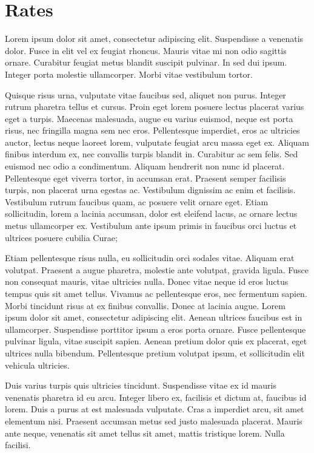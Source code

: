 \chapter{Rates}
\label{ch:10}

Lorem ipsum dolor sit amet, consectetur adipiscing elit. Suspendisse a venenatis dolor. Fusce in elit vel ex feugiat rhoncus. Mauris vitae mi non odio sagittis ornare. Curabitur feugiat metus blandit suscipit pulvinar. In sed dui ipsum. Integer porta molestie ullamcorper. Morbi vitae vestibulum tortor.

Quisque risus urna, vulputate vitae faucibus sed, aliquet non purus. Integer rutrum pharetra tellus et cursus. Proin eget lorem posuere lectus placerat varius eget a turpis. Maecenas malesuada, augue eu varius euismod, neque est porta risus, nec fringilla magna sem nec eros. Pellentesque imperdiet, eros ac ultricies auctor, lectus neque laoreet lorem, vulputate feugiat arcu massa eget ex. Aliquam finibus interdum ex, nec convallis turpis blandit in. Curabitur ac sem felis. Sed euismod nec odio a condimentum. Aliquam hendrerit non nunc id placerat. Pellentesque eget viverra tortor, in accumsan erat. Praesent semper facilisis turpis, non placerat urna egestas ac. Vestibulum dignissim ac enim et facilisis. Vestibulum rutrum faucibus quam, ac posuere velit ornare eget. Etiam sollicitudin, lorem a lacinia accumsan, dolor est eleifend lacus, ac ornare lectus metus ullamcorper ex. Vestibulum ante ipsum primis in faucibus orci luctus et ultrices posuere cubilia Curae;

Etiam pellentesque risus nulla, eu sollicitudin orci sodales vitae. Aliquam erat volutpat. Praesent a augue pharetra, molestie ante volutpat, gravida ligula. Fusce non consequat mauris, vitae ultricies nulla. Donec vitae neque id eros luctus tempus quis sit amet tellus. Vivamus ac pellentesque eros, nec fermentum sapien. Morbi tincidunt risus at ex finibus convallis. Donec at lacinia augue. Lorem ipsum dolor sit amet, consectetur adipiscing elit. Aenean ultrices faucibus est in ullamcorper. Suspendisse porttitor ipsum a eros porta ornare. Fusce pellentesque pulvinar ligula, vitae suscipit sapien. Aenean pretium dolor quis ex placerat, eget ultrices nulla bibendum. Pellentesque pretium volutpat ipsum, et sollicitudin elit vehicula ultricies.

Duis varius turpis quis ultricies tincidunt. Suspendisse vitae ex id mauris venenatis pharetra id eu arcu. Integer libero ex, facilisis et dictum at, faucibus id lorem. Duis a purus at est malesuada vulputate. Cras a imperdiet arcu, sit amet elementum nisi. Praesent accumsan metus sed justo malesuada placerat. Mauris ante neque, venenatis sit amet tellus sit amet, mattis tristique lorem. Nulla facilisi.

